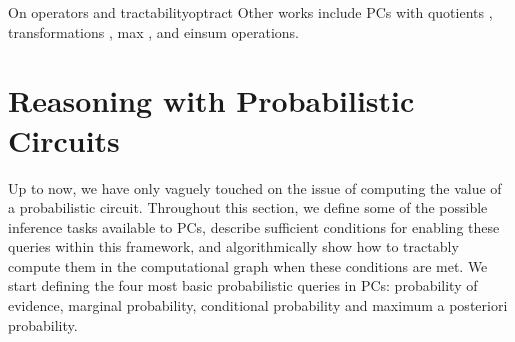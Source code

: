 \begin{remark}[breakable]{On operators and tractability}{optract}
  Other works include PCs with quotients \citep{sharir18a}, transformations \citep{pevny20a}, max
  \citep{melibari16a}, and einsum \citep{peharz20b} operations.
\end{remark}

\section{Reasoning with Probabilistic Circuits}
\label{sec:inf}

Up to now, we have only vaguely touched on the issue of computing the value of a probabilistic
circuit. Throughout this section, we define some of the possible inference tasks available to PCs,
describe sufficient conditions for enabling these queries within this framework, and
algorithmically show how to tractably compute them in the computational graph when these conditions
are met. We start defining the four most basic probabilistic queries in PCs: probability of
evidence, marginal probability, conditional probability and maximum a posteriori probability.

